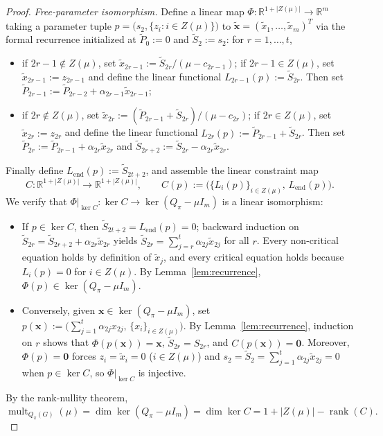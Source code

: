 \documentclass[11pt,a4paper]{article}
\theoremstyle{definition}
\DeclareMathOperator{\mult}{mult}
\DeclareMathOperator{\rank}{rank}
\begin{document}
\begin{proof}
  \emph{Free-parameter isomorphism.} Define a linear map $\Phi : \mathbb{R}^{1 + |Z(\mu)|} \to \mathbb{R}^m$ taking a parameter tuple $p = \bigl(s_2, \{z_i : i \in Z(\mu)\}\bigr)$ to $\tilde{\mathbf{x}} = (\tilde{x}_1,\dots,\tilde{x}_m)^T$ via the formal recurrence initialized at $\tilde{P}_0 := 0$ and $\tilde{S}_2 := s_2$: for $r = 1,\dots,t$,
  \begin{itemize}
    \item if $2r-1 \notin Z(\mu)$, set $\tilde{x}_{2r-1} := \tilde{S}_{2r}/(\mu - c_{2r-1})$; if $2r-1 \in Z(\mu)$, set $\tilde{x}_{2r-1} := z_{2r-1}$ and define the linear functional $L_{2r-1}(p) := \tilde{S}_{2r}$. Then set $\tilde{P}_{2r-1} := \tilde{P}_{2r-2} + \alpha_{2r-1}\tilde{x}_{2r-1}$;
    \item if $2r \notin Z(\mu)$, set $\tilde{x}_{2r} := (\tilde{P}_{2r-1} + \tilde{S}_{2r})/(\mu - c_{2r})$; if $2r \in Z(\mu)$, set $\tilde{x}_{2r} := z_{2r}$ and define the linear functional $L_{2r}(p) := \tilde{P}_{2r-1} + \tilde{S}_{2r}$. Then set $\tilde{P}_{2r} := \tilde{P}_{2r-1} + \alpha_{2r}\tilde{x}_{2r}$ and $\tilde{S}_{2r+2} := \tilde{S}_{2r} - \alpha_{2r}\tilde{x}_{2r}$.
  \end{itemize}
  Finally define $L_{\mathrm{end}}(p) := \tilde{S}_{2t+2}$, and assemble the linear constraint map
  \[
    C : \mathbb{R}^{1 + |Z(\mu)|} \longrightarrow \mathbb{R}^{1 + |Z(\mu)|}, \qquad
    C(p) := \bigl(\{L_i(p)\}_{i \in Z(\mu)},\, L_{\mathrm{end}}(p)\bigr).
  \]
  We verify that $\Phi|_{\ker C} : \ker C \to \ker(Q_\pi - \mu I_m)$ is a linear isomorphism:
  \begin{itemize}
    \item If $p \in \ker C$, then $\tilde{S}_{2t+2} = L_{\mathrm{end}}(p) = 0$; backward induction on $\tilde{S}_{2r} = \tilde{S}_{2r+2} + \alpha_{2r}\tilde{x}_{2r}$ yields $\tilde{S}_{2r} = \sum_{j=r}^t \alpha_{2j}\tilde{x}_{2j}$ for all $r$. Every non-critical equation holds by definition of $\tilde{x}_j$, and every critical equation holds because $L_i(p) = 0$ for $i \in Z(\mu)$. By Lemma~\ref{lem:recurrence}, $\Phi(p) \in \ker(Q_\pi - \mu I_m)$.
    \item Conversely, given $\mathbf{x} \in \ker(Q_\pi - \mu I_m)$, set $p(\mathbf{x}) := \bigl(\sum_{j=1}^t \alpha_{2j} x_{2j},\, \{x_i\}_{i \in Z(\mu)}\bigr)$. By Lemma~\ref{lem:recurrence}, induction on $r$ shows that $\Phi(p(\mathbf{x})) = \mathbf{x}$, $\tilde{S}_{2r} = S_{2r}$, and $C(p(\mathbf{x})) = \mathbf{0}$. Moreover, $\Phi(p) = \mathbf{0}$ forces $z_i = \tilde{x}_i = 0$ ($i \in Z(\mu)$) and $s_2 = \tilde{S}_2 = \sum_{j=1}^t \alpha_{2j}\tilde{x}_{2j} = 0$ when $p \in \ker C$, so $\Phi|_{\ker C}$ is injective.
  \end{itemize}
  By the rank-nullity theorem,
  \begin{equation}\label{eq:dim_formula}
    \mult_{Q_\pi(G)}(\mu) = \dim\ker(Q_\pi - \mu I_m) = \dim\ker C = 1 + |Z(\mu)| - \rank(C).
  \end{equation}


\end{proof}
\end{document}
